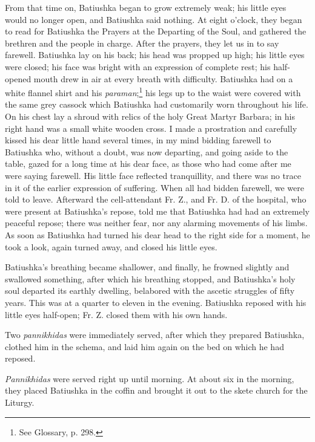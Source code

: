 From that time on, Batiushka began to grow extremely weak; his little eyes would no longer open, and Batiushka said nothing. At eight o'clock, they began to read for Batiushka the Prayers at the Departing of the Soul, and gathered the brethren and the people in charge. After the prayers, they let us in to say farewell. Batiushka lay on his back; his head was propped up high; his little eyes were closed; his face was bright with an expression of complete rest; his half-opened mouth drew in air at every breath with difficulty. Batiushka had on a white flannel shirt and his \textit{paraman};\footnote{See Glossary, p. 298.} his legs up to the waist were covered with the same grey cassock which Batiushka had customarily worn throughout his life. On his chest lay a shroud with relics of the holy Great Martyr Barbara; in his right hand was a small white wooden cross. I made a prostration and carefully kissed his dear little hand several times, in my mind bidding farewell to Batiushka who, without a doubt, was now departing, and going aside to the table, gazed for a long time at his dear face, as those who had come after me were saying farewell. His little face reflected tranquillity, and there was no trace in it of the earlier expression of suffering. When all had bidden farewell, we were told to leave. Afterward the cell-attendant Fr. Z., and Fr. D. of the hospital, who were present at Batiushka's repose, told me that Batiushka had had an extremely peaceful repose; there was neither fear, nor any alarming movements of his limbs. As soon as Batiushka had turned his dear head to the right side for a moment, he took a look, again turned away, and closed his little eyes.

Batiushka's breathing became shallower, and finally, he frowned slightly and swallowed something, after which his breathing stopped, and Batiushka's holy soul departed its earthly dwelling, belabored with the ascetic struggles of fifty years. This was at a quarter to eleven in the evening. Batiushka reposed with his little eyes half-open; Fr. Z. closed them with his own hands.

Two \textit{pannikhidas} were immediately served, after which they prepared Batiushka, clothed him in the schema, and laid him again on the bed on which he had reposed.

\textit{Pannikhidas} were served right up until morning. At about six in the morning, they placed Batiushka in the coffin and brought it out to the skete church for the Liturgy.

